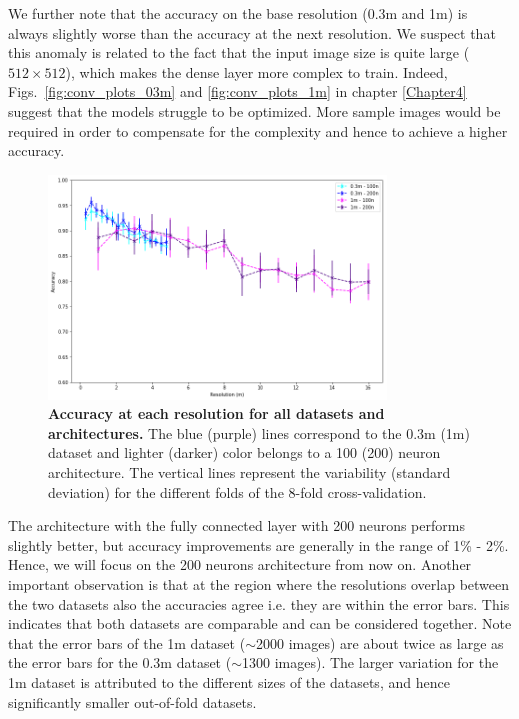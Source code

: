 We further note that the accuracy on the base resolution (0.3m and 1m) is always slightly worse than the accuracy at the next resolution. We suspect that this anomaly is related to the fact that the input image size is quite large ($512\times512$), which makes the dense layer more complex to train. Indeed, Figs.~\ref{fig:conv_plots_03m} and \ref{fig:conv_plots_1m} in chapter \ref{Chapter4} suggest that the models struggle to be optimized. More sample images would be required in order to compensate for the complexity and hence to achieve a higher accuracy.

\begin{figure}[h!]
	\centering
	\includegraphics[width=0.8\textwidth]{Figures/results/acc_res_03m_1m.png}
	\captionsetup{width=1\linewidth}
	\caption{\textbf{Accuracy at each resolution for all datasets and architectures.} The blue (purple) lines correspond to the 0.3m (1m) dataset and lighter (darker) color belongs to a 100 (200) neuron architecture. The vertical lines represent the variability (standard deviation) for the different folds of the 8-fold cross-validation.}
	\label{fig:acc_res_03m_1m}
\end{figure}

The architecture with the fully connected layer with 200 neurons performs slightly better, but accuracy improvements are generally in the range of 1\% - 2\%. Hence, we will focus on the 200 neurons architecture from now on. Another important observation is that at the region where the resolutions overlap between the two datasets also the accuracies agree i.e. they are within the error bars. This indicates that both datasets are comparable and can be considered together.
Note that the error bars of the 1m dataset ($\sim$2000 images) are about twice as large as the error bars for the 0.3m dataset ($\sim$1300 images). The larger variation for the 1m dataset is attributed to the different sizes of the datasets, and hence significantly smaller out-of-fold datasets.

